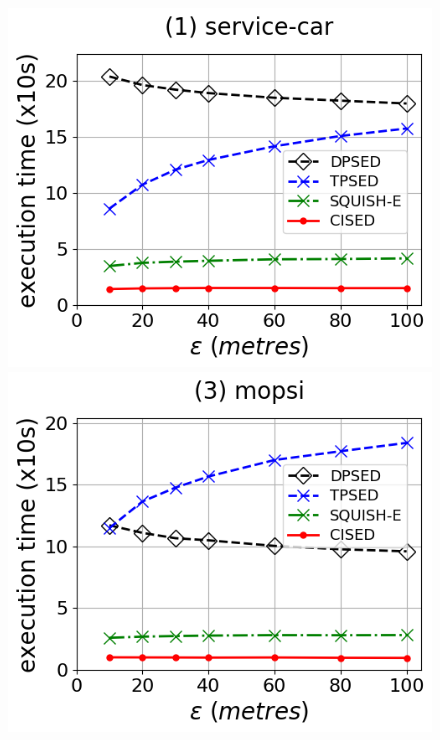 \begin{figure}[tb!]
	\centering
	\includegraphics[scale=0.315]{Figures/Exp-time-epsilon-service.png}	\hspace{1ex}
	\includegraphics[scale=0.315]{Figures/Exp-time-epsilon-mopsi.png}	\hspace{1ex}

\end{figure}
